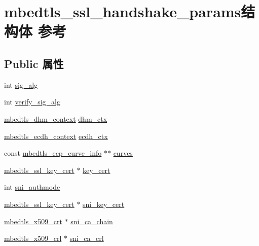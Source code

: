 \hypertarget{structmbedtls__ssl__handshake__params}{}\section{mbedtls\+\_\+ssl\+\_\+handshake\+\_\+params结构体 参考}
\label{structmbedtls__ssl__handshake__params}
\subsection*{Public 属性}
\begin{DoxyCompactItemize}
\item 
int \hyperlink{structmbedtls__ssl__handshake__params_a5bd51cd234637157e288f1e5779701c5}{sig\+\_\+alg}
\item 
int \hyperlink{structmbedtls__ssl__handshake__params_ab950ce283cc477ea1a246689ecd2a22d}{verify\+\_\+sig\+\_\+alg}
\item 
\hyperlink{structmbedtls__dhm__context}{mbedtls\+\_\+dhm\+\_\+context} \hyperlink{structmbedtls__ssl__handshake__params_aaa85609e03e300c910db01e8a321950f}{dhm\+\_\+ctx}
\item 
\hyperlink{structmbedtls__ecdh__context}{mbedtls\+\_\+ecdh\+\_\+context} \hyperlink{structmbedtls__ssl__handshake__params_ac817564988b758dfa0d6829f78817712}{ecdh\+\_\+ctx}
\item 
const \hyperlink{structmbedtls__ecp__curve__info}{mbedtls\+\_\+ecp\+\_\+curve\+\_\+info} $\ast$$\ast$ \hyperlink{structmbedtls__ssl__handshake__params_a521abec631fe5c81cf5c094cc374b8eb}{curves}
\item 
\hyperlink{structmbedtls__ssl__key__cert}{mbedtls\+\_\+ssl\+\_\+key\+\_\+cert} $\ast$ \hyperlink{structmbedtls__ssl__handshake__params_a149899c222855d2cc33aa4cc326b09cd}{key\+\_\+cert}
\item 
int \hyperlink{structmbedtls__ssl__handshake__params_ada4c8d021bb297b6728d6f117a026fd0}{sni\+\_\+authmode}
\item 
\hyperlink{structmbedtls__ssl__key__cert}{mbedtls\+\_\+ssl\+\_\+key\+\_\+cert} $\ast$ \hyperlink{structmbedtls__ssl__handshake__params_abe0893bc6a388d5e2f584cd4025a76b4}{sni\+\_\+key\+\_\+cert}
\item 
\hyperlink{structmbedtls__x509__crt}{mbedtls\+\_\+x509\+\_\+crt} $\ast$ \hyperlink{structmbedtls__ssl__handshake__params_a4d18e84d136e133fe5edfff81a207168}{sni\+\_\+ca\+\_\+chain}
\item 
\hyperlink{structmbedtls__x509__crl}{mbedtls\+\_\+x509\+\_\+crl} $\ast$ \hyperlink{structmbedtls__ssl__handshake__params_ae2b1df99f674ec78b072234a0bb4fa40}{sni\+\_\+ca\+\_\+crl}
$$
\end{DoxyCompactItemize}
